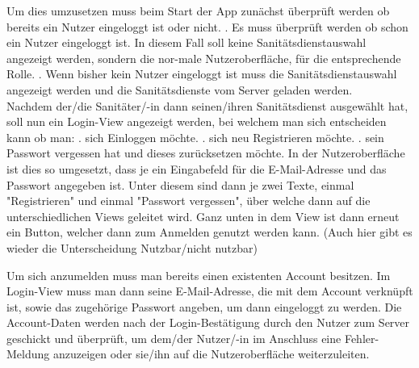             
            \noindent Um dies umzusetzen muss beim Start der App zunächst überprüft werden 
            ob bereits ein Nutzer eingeloggt ist oder nicht.
            . Es muss überprüft werden ob schon ein Nutzer eingeloggt ist. In diesem \hspace*{5mm}Fall soll keine 
            Sanitätsdienstauswahl angezeigt werden, sondern die nor-\hspace*{5mm}male Nutzeroberfläche, für die entsprechende Rolle.
            . Wenn bisher kein Nutzer eingeloggt ist muss die Sanitätsdienstauswahl \hspace*{5mm}angezeigt werden 
            und die Sanitätsdienste vom Server
            geladen werden.
            \newline\\
            Nachdem der/die Sanitäter/-in dann seinen/ihren Sanitätsdienst ausgewählt hat, soll nun
            ein Login-View angezeigt werden, bei welchem man sich entscheiden kann ob man:
            . sich Einloggen möchte.
            . sich neu Registrieren möchte.
            . sein Passwort vergessen hat und dieses zurücksetzen möchte.
            \newline
            In der Nutzeroberfläche ist dies so umgesetzt, dass je ein Eingabefeld für die E-Mail-Adresse und das Passwort angegeben ist.
            Unter diesem sind dann je zwei Texte, einmal "Registrieren" und einmal "Passwort vergessen", über welche dann auf die unterschiedlichen Views
            geleitet wird.
            Ganz unten in dem View ist dann erneut ein Button, welcher dann zum Anmelden genutzt werden kann. (Auch hier gibt es wieder die Unterscheidung Nutzbar/nicht nutzbar)


            \noindent Um sich anzumelden muss man bereits einen existenten Account besitzen.
            Im Login-View muss man dann seine E-Mail-Adresse, die mit dem Account verknüpft ist, sowie das 
            zugehörige Passwort angeben, um dann eingeloggt zu werden. Die Account-Daten werden nach der Login-Bestätigung
            durch den Nutzer zum Server geschickt und überprüft, um dem/der Nutzer/-in  im Anschluss eine Fehler-Meldung
            anzuzeigen oder sie/ihn auf die Nutzeroberfläche weiterzuleiten.

